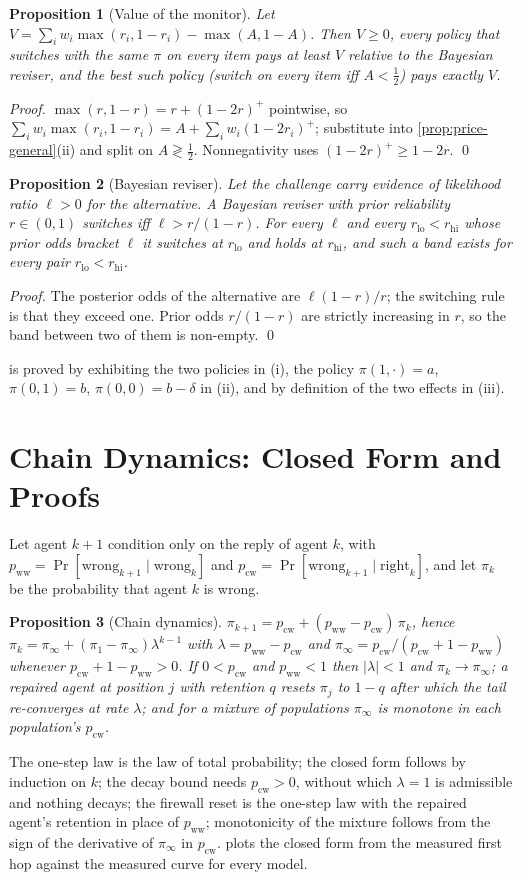 \documentclass{article}
\newtheorem{proposition}{Proposition}
\newcommand{\pww}{p_{\mathrm{ww}}}
\newcommand{\pcw}{p_{\mathrm{cw}}}
\newcommand{\piinf}{\pi_{\infty}}
\begin{document}
\begin{proposition}[Value of the monitor]\label{prop:voi}
Let $V=\sum_i w_i\max(r_i,1-r_i)-\max(A,1-A)$. Then $V\geq 0$, every policy that switches with the same $\pi$ on every item pays at least $V$ relative to the Bayesian reviser, and the best such policy (switch on every item iff $A<\tfrac12$) pays exactly $V$.
\end{proposition}
\emph{Proof.} $\max(r,1-r)=r+(1-2r)^{+}$ pointwise, so $\sum_i w_i\max(r_i,1-r_i)=A+\sum_i w_i(1-2r_i)^{+}$; substitute into \cref{prop:price-general}(ii) and split on $A\gtrless\tfrac12$. Nonnegativity uses $(1-2r)^{+}\geq 1-2r$. \qed

\begin{proposition}[Bayesian reviser]\label{prop:bayes}
Let the challenge carry evidence of likelihood ratio $\ell>0$ for the alternative. A Bayesian reviser with prior reliability $r\in(0,1)$ switches iff $\ell>r/(1-r)$. For every $\ell$ and every $r_{\mathrm{lo}}<r_{\mathrm{hi}}$ whose prior odds bracket $\ell$ it switches at $r_{\mathrm{lo}}$ and holds at $r_{\mathrm{hi}}$, and such a band exists for every pair $r_{\mathrm{lo}}<r_{\mathrm{hi}}$.
\end{proposition}
\emph{Proof.} The posterior odds of the alternative are $\ell(1-r)/r$; the switching rule is that they exceed one. Prior odds $r/(1-r)$ are strictly increasing in $r$, so the band between two of them is non-empty. \qed

 is proved by exhibiting the two policies in (i), the policy $\pi(1,\cdot)=a$, $\pi(0,1)=b$, $\pi(0,0)=b-\delta$ in (ii), and by definition of the two effects in (iii).

\section{Chain Dynamics: Closed Form and Proofs}
\label{app:lean}
Let agent $k{+}1$ condition only on the reply of agent $k$, with $\pww=\Pr[\text{wrong}_{k+1}\mid\text{wrong}_k]$ and $\pcw=\Pr[\text{wrong}_{k+1}\mid\text{right}_k]$, and let $\pi_k$ be the probability that agent $k$ is wrong.
\begin{proposition}[Chain dynamics]\label{prop:chain}
$\pi_{k+1}=\pcw+(\pww-\pcw)\,\pi_k$, hence $\pi_k=\piinf+(\pi_1-\piinf)\lambda^{k-1}$ with $\lambda=\pww-\pcw$ and $\piinf=\pcw/(\pcw+1-\pww)$ whenever $\pcw+1-\pww>0$. If $0<\pcw$ and $\pww<1$ then $|\lambda|<1$ and $\pi_k\to\piinf$; a repaired agent at position $j$ with retention $q$ resets $\pi_j$ to $1-q$ after which the tail re-converges at rate $\lambda$; and for a mixture of populations $\piinf$ is monotone in each population's $\pcw$.
\end{proposition}
The one-step law is the law of total probability; the closed form follows by induction on $k$; the decay bound needs $\pcw>0$, without which $\lambda=1$ is admissible and nothing decays; the firewall reset is the one-step law with the repaired agent's retention in place of $\pww$; monotonicity of the mixture follows from the sign of the derivative of $\piinf$ in $\pcw$.  plots the closed form from the measured first hop against the measured curve for every model.
\end{document}
